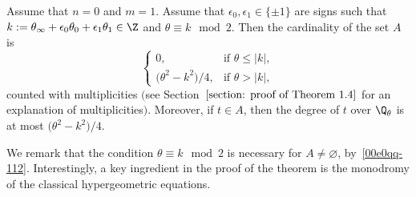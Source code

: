 \begin{Theorem} \label{theorem: sharp}
 Assume that $n=0$ and $m=1$. Assume that
 $\epsilon_0,\epsilon_1\in\{\pm1\}$ are signs such that
 $k:=\theta_\infty+\epsilon_0\theta_0+\epsilon_1\theta_1\in\Z$ and
 $\theta\equiv k\mod 2$. Then the cardinality of the set $A$ is
 \[
 \begin{cases}
 0, &\text{if }\theta\le|k|, \\
 \bigl(\theta^2-k^2\bigr)/4, &\text{if }\theta>|k|, \end{cases}
 \]
 counted with multiplicities $($see Section~$\ref{section: proof of
 Theorem 1.4}$ for an explanation of
 multiplicities$)$. Moreover, if ${t\in A}$, then the degree of $t$ over
 $\Q_\theta$ is at most $\bigl(\theta^2-k^2\bigr)/4$.
\end{Theorem}

We remark that the condition $\theta\equiv k\mod 2$ is necessary for
$A\neq\varnothing$, by~\eqref{00e0qq-112}. Interestingly, a key
ingredient in the proof of the theorem is the monodromy of the
classical hypergeometric equations.


